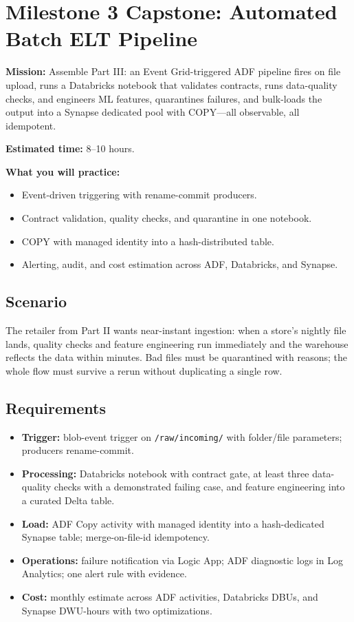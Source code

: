 \section{Milestone 3 Capstone: Automated Batch ELT Pipeline}\label{sec:ch12-capstone}

\begin{capstonebox}
\textbf{Mission:} Assemble Part III: an Event Grid-triggered ADF pipeline fires on file upload, runs a Databricks notebook that validates contracts, runs data-quality checks, and engineers ML features, quarantines failures, and bulk-loads the output into a Synapse dedicated pool with COPY---all observable, all idempotent.

\textbf{Estimated time:} 8--10 hours.

\textbf{What you will practice:}
\begin{itemize}
    \item Event-driven triggering with rename-commit producers.
    \item Contract validation, quality checks, and quarantine in one notebook.
    \item COPY with managed identity into a hash-distributed table.
    \item Alerting, audit, and cost estimation across ADF, Databricks, and Synapse.
\end{itemize}
\end{capstonebox}

\subsection*{Scenario}
The retailer from Part II wants near-instant ingestion: when a store's nightly file lands, quality checks and feature engineering run immediately and the warehouse reflects the data within minutes. Bad files must be quarantined with reasons; the whole flow must survive a rerun without duplicating a single row.

\subsection*{Requirements}
\begin{itemize}
    \item \textbf{Trigger:} blob-event trigger on \texttt{/raw/incoming/} with folder/file parameters; producers rename-commit.
    \item \textbf{Processing:} Databricks notebook with contract gate, at least three data-quality checks with a demonstrated failing case, and feature engineering into a curated Delta table.
    \item \textbf{Load:} ADF Copy activity with managed identity into a hash-dedicated Synapse table; merge-on-file-id idempotency.
    \item \textbf{Operations:} failure notification via Logic App; ADF diagnostic logs in Log Analytics; one alert rule with evidence.
    \item \textbf{Cost:} monthly estimate across ADF activities, Databricks DBUs, and Synapse DWU-hours with two optimizations.
\end{itemize}

